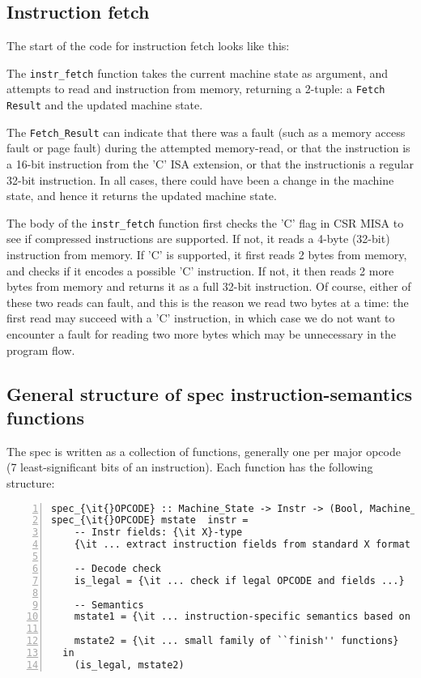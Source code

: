 \documentclass[11pt]{article}
\begin{document}
\subsection{Instruction fetch}

The start of the code for instruction fetch looks like this:



The \verb|instr_fetch| function takes the current machine state as
argument, and attempts to read and instruction from memory, returning
a 2-tuple: a \verb|Fetch Result| and the updated machine state.

The \verb|Fetch_Result| can indicate that there was a fault (such as a
memory access fault or page fault) during the attempted memory-read,
or that the instruction is a 16-bit instruction from the 'C' ISA
extension, or that the instructionis a regular 32-bit instruction.  In
all cases, there could have been a change in the machine state, and
hence it returns the updated machine state.

The body of the \verb|instr_fetch| function first checks the 'C' flag
in CSR MISA to see if compressed instructions are supported.  If not,
it reads a 4-byte (32-bit) instruction from memory.  If 'C' is
supported, it first reads 2 bytes from memory, and checks if it
encodes a possible 'C' instruction. If not, it then reads 2 more bytes
from memory and returns it as a full 32-bit instruction.  Of course,
either of these two reads can fault, and this is the reason we read
two bytes at a time: the first read may succeed with a 'C'
instruction, in which case we do not want to encounter a fault for
reading two more bytes which may be unnecessary in the program flow.


\subsection{General structure of spec instruction-semantics functions}

The spec is written as a collection of functions, generally one per
major opcode (7 least-significant bits of an instruction).  Each
function has the following structure:

{\small
\begin{Verbatim}[frame=single, numbers=left, commandchars=\\\{\}]
spec_{\it{}OPCODE} :: Machine_State -> Instr -> (Bool, Machine_State) \\
spec_{\it{}OPCODE} mstate  instr =
    -- Instr fields: {\it X}-type
    {\it ... extract instruction fields from standard X format ...}

    -- Decode check
    is_legal = {\it ... check if legal OPCODE and fields ...}

    -- Semantics
    mstate1 = {\it ... instruction-specific semantics based on {\tt mstate} ...}

    mstate2 = {\it ... small family of ``finish'' functions}
  in
    (is_legal, mstate2)
\end{Verbatim}
}
\end{document}
